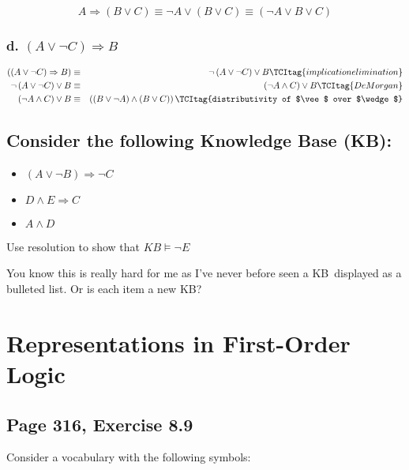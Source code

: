 \documentclass{article}
\begin{document}
\[
A\Rightarrow \left( B\vee C\right) \equiv \lnot A\vee \left( B\vee C\right)
\equiv \left( \lnot A\vee B\vee C\right) 
\]

\subsubsection{d. $\left( A\vee \lnot C\right) \Rightarrow B$}

\begin{eqnarray}
\left( \left( A\vee \lnot C\right) \Rightarrow B\right)  &\equiv &\lnot
\left( A\vee \lnot C\right) \vee B  \TCItag{implication elimination} \\
\lnot \left( A\vee \lnot C\right) \vee B &\equiv &\left( \lnot A\wedge
C\right) \vee B  \TCItag{De Morgan} \\
\left( \lnot A\wedge C\right) \vee B &\equiv &\left( \left( B\vee \lnot
A\right) \wedge \left( B\vee C\right) \right)   \TCItag{distributivity of
$\vee $ over $\wedge $}
\end{eqnarray}

\subsection{Consider the following Knowledge Base (KB):}

\begin{itemize}
\item $\left( A\vee \lnot B\right) \Rightarrow \lnot C$

\item $D\wedge E\Rightarrow C$

\item $A\wedge D$
\end{itemize}

Use resolution to show that $KB\models \lnot E$

You know this is really hard for me as I've never before seen a KB\
displayed as a bulleted list. Or is each item a new KB?

\section{Representations in First-Order Logic}

\subsection{Page 316, Exercise 8.9}

Consider a vocabulary with the following symbols:
\end{document}
